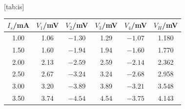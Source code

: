 [tab:is]{
\begin{tabular}{cccccc}
\toprule
$I_s$/mA & $V_1$/mV & $V_2$/mV & $V_3$/mV & $V_4$/mV & $V_H$/mV \\
\midrule
1.00 & 1.06 & $-1.30$ & 1.29 & $-1.07$ & 1.180 \\
1.50 & 1.60 & $-1.94$ & 1.94 & $-1.60$ & 1.770 \\
2.00 & 2.13 & $-2.59$ & 2.59 & $-2.14$ & 2.362 \\
2.50 & 2.67 & $-3.24$ & 3.24 & $-2.68$ & 2.958 \\
3.00 & 3.20 & $-3.89$ & 3.89 & $-3.21$ & 3.548 \\
3.50 & 3.74 & $-4.54$ & 4.54 & $-3.75$ & 4.143 \\
\bottomrule
\end{tabular}}
